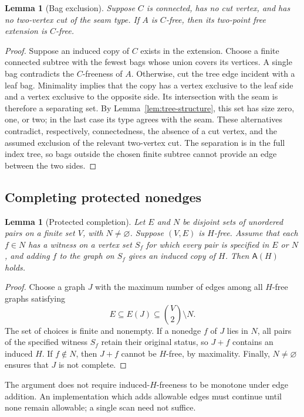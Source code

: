 \documentclass[11pt,reqno]{amsart}
\newtheorem{lemma}[theorem]{Lemma}
\theoremstyle{definition}
\theoremstyle{remark}
\newcommand{\Asat}{\mathsf{A}}
\begin{document}
\begin{lemma}[Bag exclusion]\label{lem:bag-exclusion}
Suppose $C$ is connected, has no cut vertex, and has no two-vertex cut of the seam type. If $A$ is $C$-free, then its two-point free extension is $C$-free.
\end{lemma}
\begin{proof}
Suppose an induced copy of $C$ exists in the extension. Choose a finite connected subtree with the fewest bags whose union covers its vertices. A single bag contradicts the $C$-freeness of $A$. Otherwise, cut the tree edge incident with a leaf bag. Minimality implies that the copy has a vertex exclusive to the leaf side and a vertex exclusive to the opposite side. Its intersection with the seam is therefore a separating set. By Lemma~\ref{lem:tree-structure}, this set has size zero, one, or two; in the last case its type agrees with the seam. These alternatives contradict, respectively, connectedness, the absence of a cut vertex, and the assumed exclusion of the relevant two-vertex cut. The separation is in the full index tree, so bags outside the chosen finite subtree cannot provide an edge between the two sides.
\end{proof}

\subsection{Completing protected nonedges}

\begin{lemma}[Protected completion]\label{lem:completion}
Let $E$ and $N$ be disjoint sets of unordered pairs on a finite set $V$, with $N\ne\varnothing$. Suppose $(V,E)$ is $H$-free. Assume that each $f\in N$ has a witness on a vertex set $S_f$ for which every pair is specified in $E$ or $N$, and adding $f$ to the graph on $S_f$ gives an induced copy of $H$. Then $\Asat(H)$ holds.
\end{lemma}
\begin{proof}
Choose a graph $J$ with the maximum number of edges among all $H$-free graphs satisfying
\[
 E\subseteq E(J)\subseteq\binom V2\setminus N.
\]
The set of choices is finite and nonempty. If a nonedge $f$ of $J$ lies in $N$, all pairs of the specified witness $S_f$ retain their original status, so $J+f$ contains an induced $H$. If $f\notin N$, then $J+f$ cannot be $H$-free, by maximality. Finally, $N\ne\varnothing$ ensures that $J$ is not complete.
\end{proof}

The argument does not require induced-$H$-freeness to be monotone under edge addition. An implementation which adds allowable edges must continue until none remain allowable; a single scan need not suffice.
\end{document}
